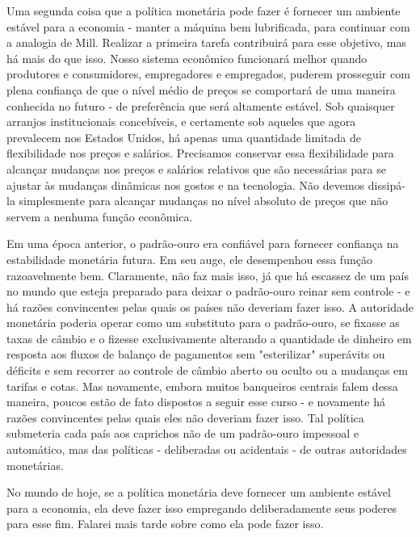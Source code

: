 \documentclass[a4paper,12pt]{article}[abntex2]
\begin{document}
Uma segunda coisa que a política monetária pode fazer é fornecer um ambiente estável para a economia - manter a máquina bem lubrificada, para continuar com a analogia de Mill. Realizar a primeira tarefa contribuirá para esse objetivo, mas há mais do que isso. Nosso sistema econômico funcionará melhor quando produtores e consumidores, empregadores e empregados, puderem prosseguir com plena confiança de que o nível médio de preços se comportará de uma maneira conhecida no futuro - de preferência que será altamente estável. Sob quaisquer arranjos institucionais concebíveis, e certamente sob aqueles que agora prevalecem nos Estados Unidos, há apenas uma quantidade limitada de flexibilidade nos preços e salários. Precisamos conservar essa flexibilidade para alcançar mudanças nos preços e salários relativos que são necessárias para se ajustar às mudanças dinâmicas nos gostos e na tecnologia. Não devemos dissipá-la simplesmente para alcançar mudanças no nível absoluto de preços que não servem a nenhuma função econômica.

Em uma época anterior, o padrão-ouro era confiável para fornecer confiança na estabilidade monetária futura. Em seu auge, ele desempenhou essa função razoavelmente bem. Claramente, não faz mais isso, já que há escassez de um país no mundo que esteja preparado para deixar o padrão-ouro reinar sem controle - e há razões convincentes pelas quais os países não deveriam fazer isso. A autoridade monetária poderia operar como um substituto para o padrão-ouro, se fixasse as taxas de câmbio e o fizesse exclusivamente alterando a quantidade de dinheiro em resposta aos fluxos de balanço de pagamentos sem "esterilizar" superávits ou déficits e sem recorrer ao controle de câmbio aberto ou oculto ou a mudanças em tarifas e cotas. Mas novamente, embora muitos banqueiros centrais falem dessa maneira, poucos estão de fato dispostos a seguir esse curso - e novamente há razões convincentes pelas quais eles não deveriam fazer isso. Tal política submeteria cada país aos caprichos não de um padrão-ouro impessoal e automático, mas das políticas - deliberadas ou acidentais - de outras autoridades monetárias.

No mundo de hoje, se a política monetária deve fornecer um ambiente estável para a economia, ela deve fazer isso empregando deliberadamente seus poderes para esse fim. Falarei mais tarde sobre como ela pode fazer isso.
\end{document}
